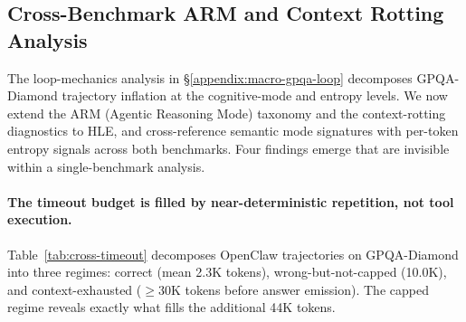 
\subsection{Cross-Benchmark ARM and Context Rotting Analysis}
\label{appendix:macro-cross}

The loop-mechanics analysis in \S\ref{appendix:macro-gpqa-loop} decomposes GPQA-Diamond
trajectory inflation at the cognitive-mode and entropy levels.
We now extend the ARM (Agentic Reasoning Mode) taxonomy and the context-rotting
diagnostics to HLE, and cross-reference semantic mode signatures with per-token
entropy signals across both benchmarks.
Four findings emerge that are invisible within a single-benchmark analysis.

\paragraph{The timeout budget is filled by near-deterministic repetition, not
tool execution.}

Table~\ref{tab:cross-timeout} decomposes OpenClaw trajectories on GPQA-Diamond
into three regimes: correct (mean 2.3K tokens), wrong-but-not-capped (10.0K),
and context-exhausted ($\ge$30K tokens before answer emission).
The capped regime reveals exactly what fills the additional 44K tokens.

